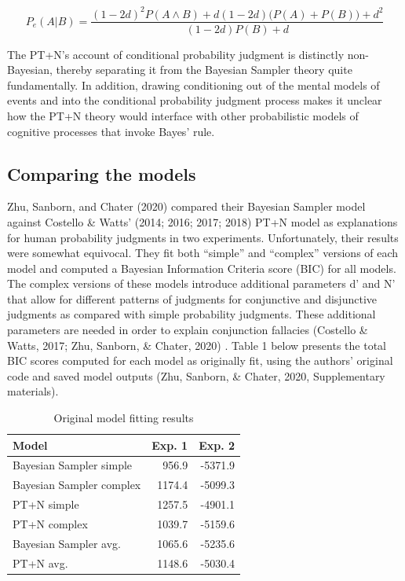 \documentclass[
  english,
  man,floatsintext]{apa6}
\begin{document}
\[ P_e(A|B) = \frac{(1-2d)^2P(A \land B) + d(1-2d)\big(P(A)+P(B)\big)+d^2}{(1-2d)P(B)+d} \]

The PT+N's account of conditional probability judgment is distinctly non-Bayesian, thereby separating it from the Bayesian Sampler theory quite fundamentally. In addition, drawing conditioning out of the mental models of events and into the conditional probability judgment process makes it unclear how the PT+N theory would interface with other probabilistic models of cognitive processes that invoke Bayes' rule.

\hypertarget{comparing-the-models}{%
\subsection{Comparing the models}\label{comparing-the-models}}

Zhu, Sanborn, and Chater (2020) compared their Bayesian Sampler model against Costello \& Watts' (2014; 2016; 2017; 2018) PT+N model as explanations for human probability judgments in two experiments. Unfortunately, their results were somewhat equivocal. They fit both ``simple'' and ``complex'' versions of each model and computed a Bayesian Information Criteria score (BIC) for all models. The complex versions of these models introduce additional parameters d' and N' that allow for different patterns of judgments for conjunctive and disjunctive judgments as compared with simple probability judgments. These additional parameters are needed in order to explain conjunction fallacies (Costello \& Watts, 2017; Zhu, Sanborn, \& Chater, 2020) . Table 1 below presents the total BIC scores computed for each model as originally fit, using the authors' original code and saved model outputs (Zhu, Sanborn, \& Chater, 2020, Supplementary materials).

\begin{table}

\caption{\label{tab:table1}Original model fitting results}
\centering
\begin{tabular}[t]{lrr}
\toprule
Model & Exp. 1 & Exp. 2\\
\midrule
Bayesian Sampler simple & 956.9 & -5371.9\\
Bayesian Sampler complex & 1174.4 & -5099.3\\
PT+N simple & 1257.5 & -4901.1\\
PT+N complex & 1039.7 & -5159.6\\
Bayesian Sampler avg. & 1065.6 & -5235.6\\
\addlinespace
PT+N avg. & 1148.6 & -5030.4\\
\bottomrule
\end{tabular}
\end{table}
\end{document}

